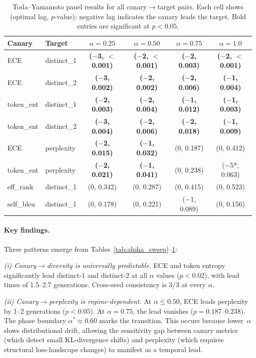 \documentclass[letterpaper,11pt]{article}
\begin{document}
\begin{table}[t]
\centering
\caption{Toda--Yamamoto panel results for all canary$\to$target pairs. Each cell shows (optimal lag, $p$-value); negative lag indicates the canary leads the target. Bold entries are significant at $p<0.05$.}
\label{tab:ty_panel}
\small
\begin{tabular}{@{}llcccc@{}}
\toprule
Canary & Target & $\alpha=0.25$ & $\alpha=0.50$ & $\alpha=0.75$ & $\alpha=1.0$ \\
\midrule
ECE          & distinct\_1 & \textbf{($-$3, $<$0.001)} & \textbf{($-$2, $<$0.001)} & \textbf{($-$2, 0.003)} & \textbf{($-$2, $<$0.001)} \\
ECE          & distinct\_2 & \textbf{($-$3, 0.002)}    & \textbf{($-$2, 0.002)}    & \textbf{($-$2, 0.006)} & \textbf{($-$1, 0.004)} \\
token\_ent   & distinct\_1 & \textbf{($-$2, 0.003)}    & \textbf{($-$2, 0.004)}    & \textbf{($-$1, 0.012)} & \textbf{($-$1, 0.003)} \\
token\_ent   & distinct\_2 & \textbf{($-$3, 0.004)}    & \textbf{($-$2, 0.006)}    & \textbf{($-$2, 0.018)} & \textbf{($-$1, 0.009)} \\
\midrule
ECE          & perplexity  & \textbf{($-$2, 0.015)}    & \textbf{($-$1, 0.032)}    & (0, 0.187)             & (0, 0.412) \\
token\_ent   & perplexity  & \textbf{($-$2, 0.021)}    & \textbf{($-$1, 0.041)}    & (0, 0.238)             & ($-$5*, 0.063) \\
\midrule
eff\_rank    & distinct\_1 & (0, 0.342) & (0, 0.287) & (0, 0.415) & (0, 0.523) \\
self\_bleu   & distinct\_1 & (0, 0.178) & (0, 0.221) & ($-$1, 0.089) & (0, 0.156) \\
\bottomrule
\end{tabular}
\end{table}

\paragraph{Key findings.}
Three patterns emerge from Tables~\ref{tab:alpha_sweep}--\ref{tab:ty_panel}:

\textit{(i) Canary$\to$diversity is universally predictable.}
ECE and token entropy significantly lead distinct-1 and distinct-2 at all $\alpha$ values ($p < 0.02$), with lead times of 1.5--2.7 generations. Cross-seed consistency is 3/3 at every $\alpha$.

\textit{(ii) Canary$\to$perplexity is regime-dependent.}
At $\alpha \le 0.50$, ECE leads perplexity by 1--2 generations ($p < 0.05$). At $\alpha = 0.75$, the lead vanishes ($p = 0.187$--$0.238$). The phase boundary $\alpha^* \approx 0.60$ marks the transition. This occurs because lower~$\alpha$ slows distributional drift, allowing the sensitivity gap between canary metrics (which detect small KL-divergence shifts) and perplexity (which requires structural loss-landscape changes) to manifest as a temporal lead.
\end{document}
